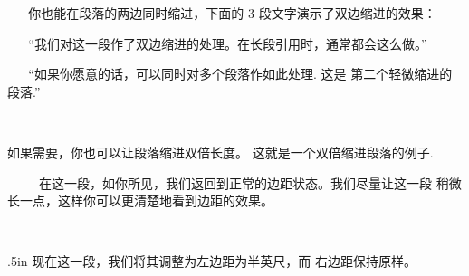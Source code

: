 ~%
~%
你也能在段落的两边同时缩进，下面的 3 段文字演示了双边缩进的效果：

\smallskip %
{\narrower
~%
~%
``我们对这一段作了双边缩进的处理。在长段引用时，通常都会这么做。''

~%
~%
``如果你愿意的话，可以同时对多个段落作如此处理.  这是
第二个轻微缩进的段落.''\par}

~%
~%
~%
{\narrower \narrower 如果需要，你也可以让段落缩进双倍长度。
这就是一个双倍缩进段落的例子.\par}
\vskip 1pc %
~%
~%
~%
在这一段，如你所见，我们返回到正常的边距状态。我们尽量让这一段
稍微长一点，这样你可以更清楚地看到边距的效果。

~%
~%
{\leftskip .5in 现在这一段，我们将其调整为左边距为半英尺，而
右边距保持原样。\par}

